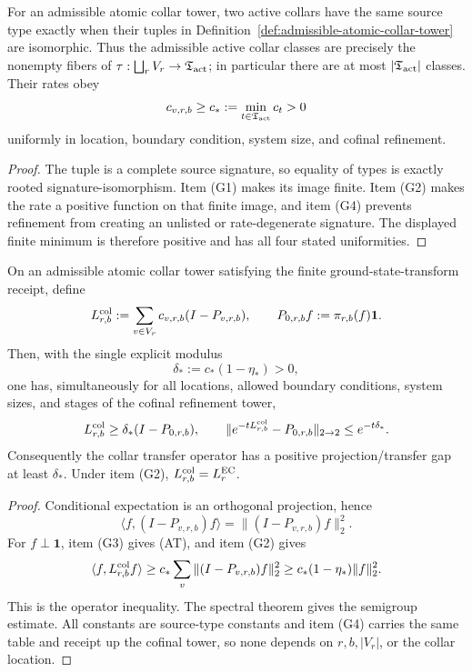 \begin{proposition}
\label{lem:repair-rate-floor}
For an admissible atomic collar tower, two active collars have the same source type exactly when
their tuples in Definition~\ref{def:admissible-atomic-collar-tower} are isomorphic.  Thus the
admissible active collar classes are precisely the nonempty fibers of
\(\tau:\bigsqcup_r V_r\to\mathfrak T_{\rm act}\); in particular there are at most
\(|\mathfrak T_{\rm act}|\) classes.  Their rates obey
\[
c_{v,r,b}\ge c_*:=\min_{t\in\mathfrak T_{\rm act}}c_t>0
\]
uniformly in location, boundary condition, system size, and cofinal refinement.
\end{proposition}

\begin{proof}
The tuple is a complete source signature, so equality of types is exactly rooted
signature-isomorphism.  Item \textup{(G1)} makes its image finite.  Item \textup{(G2)} makes the
rate a positive function on that finite image, and item \textup{(G4)} prevents refinement from
creating an unlisted or rate-degenerate signature.  The displayed finite minimum is therefore
positive and has all four stated uniformities.
\end{proof}

\begin{theorem}
\label{prop:finite-stage-repair-gap}
On an admissible atomic collar tower satisfying the finite ground-state-transform receipt, define
\[
L_{r,b}^{\rm col}:=\sum_{v\in V_r}c_{v,r,b}(I-P_{v,r,b}),
\qquad P_{0,r,b}f:=\pi_{r,b}(f)\mathbf1.
\]
Then, with the single explicit modulus
\[
\delta_*:=c_*(1-\eta_*)>0,
\tag{GAP}
\]
one has, simultaneously for all locations, allowed boundary conditions, system sizes, and stages
of the cofinal refinement tower,
\[
L_{r,b}^{\rm col}\ge\delta_*(I-P_{0,r,b}),
\qquad
\|e^{-tL_{r,b}^{\rm col}}-P_{0,r,b}\|_{2\to2}\le e^{-t\delta_*}.
\]
Consequently the collar transfer operator has a positive projection/transfer gap at least
\(\delta_*\).  Under item \textup{(G2)}, \(L_{r,b}^{\rm col}=L_r^{\rm EC}\).
\end{theorem}

\begin{proof}
Conditional expectation is an orthogonal projection, hence
\[
\langle f,(I-P_{v,r,b})f\rangle
=\|(I-P_{v,r,b})f\|_2^2.
\]
For \(f\perp\mathbf1\), item \textup{(G3)} gives (AT), and item \textup{(G2)} gives
\[
\langle f,L_{r,b}^{\rm col}f\rangle
\ge c_*\sum_v\|(I-P_{v,r,b})f\|_2^2
\ge c_*(1-\eta_*)\|f\|_2^2.
\]
This is the operator inequality.  The spectral theorem gives the semigroup estimate.  All
constants are source-type constants and item \textup{(G4)} carries the same table and receipt up
the cofinal tower, so none depends on \(r,b,|V_r|\), or the collar location.
\end{proof}


